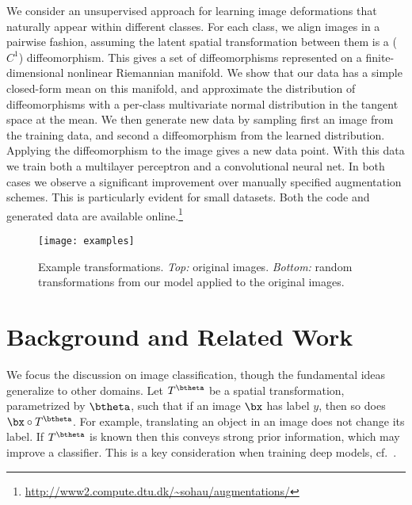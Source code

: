 \documentclass[twoside]{article}
\newcommand{\R}{\mathbb{R}}
\begin{document}
  We consider an unsupervised approach for learning image deformations
  that naturally appear within different classes. 
  For each class, we align images in a pairwise fashion, assuming the latent
  spatial transformation between them is a ($C^1$) diffeomorphism.
  This gives a set of diffeomorphisms represented
  on a finite-dimensional nonlinear Riemannian manifold. We show that our data has a simple
  closed-form mean on this manifold, and approximate the distribution of
  diffeomorphisms with a per-class multivariate normal distribution in
  the tangent space at the mean. We then generate new data
  by sampling first an image from the training data, and second a diffeomorphism
  from the learned distribution.
  Applying the diffeomorphism to the image gives a new data point.
  With this data we train both a multilayer perceptron and a convolutional neural net.
  In both cases we observe a significant
  improvement over manually specified augmentation schemes. This is particularly
  evident for small datasets.
  Both the code and generated data are available 
online.\footnote{\url{http://www2.compute.dtu.dk/~sohau/augmentations/}}\begin{figure*}[t]
    \texttt{[image: examples]}
    \caption{Example transformations.
      \emph{Top:} original images.
      \emph{Bottom:} random transformations from our model applied to the original images.}
    \label{fig:examples}
  \end{figure*}
  \section{Background and Related Work}\label{sec:background}
  We focus the discussion on image classification, though the fundamental ideas
  generalize to other domains.
    Let $T^{\btheta}$ 
  be a spatial transformation, parametrized by $\btheta$,
  such that if an image $\bx$ has label $y$, then
  so does  $\bx \circ T^{\btheta} $.
  For example, translating an
  object in an image does not change its label. If $T^{\btheta}$ is known
  then this conveys strong prior information, which may improve a classifier.
  This is a key consideration when training deep models, cf.~\cite{goodfellow2009measuring}.
\end{document}
